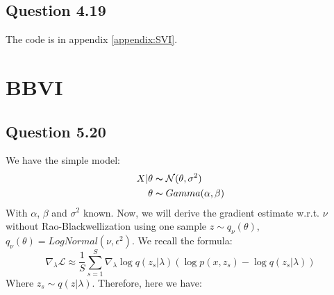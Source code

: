 \documentclass{article}
\begin{document}
\subsection*{Question 4.19}
The code is in appendix \ref{appendix:SVI}.

\section{BBVI}

\subsection*{Question 5.20}
We have the simple model:
\begin{equation}
    \begin{split}
        X|\theta & \thicksim \mathcal{N}(\theta, \sigma^2) \\
        \theta   & \thicksim Gamma(\alpha, \beta)
    \end{split}
\end{equation}
With $\alpha$, $\beta$ and $\sigma^2$ known.
Now, we will derive the gradient estimate w.r.t. $\nu$ without Rao-Blackwellization using one sample $z \sim q_\nu(\theta)$, $q_\nu(\theta) = LogNormal(\nu, \epsilon^2)$. We recall the formula:
\begin{equation}
    \nabla_\lambda\mathcal{L} \approx \frac{1}{S}\sum_{s=1}^{S}\nabla_\lambda \log q(z_s|\lambda) \left(\log p(x, z_s) - \log q(z_s|\lambda)\right)
\end{equation}
Where $z_s \sim q(z|\lambda)$. Therefore, here we have:
\end{document}
